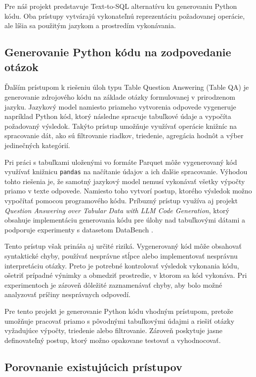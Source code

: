 Pre náš projekt predstavuje Text-to-SQL alternatívu ku generovaniu Python kódu. Oba prístupy vytvárajú vykonateľnú reprezentáciu požadovanej operácie, ale líšia sa použitým jazykom a prostredím vykonávania.

\subsection{Generovanie Python kódu na zodpovedanie otázok}
\label{subsec:python-code-generation}

Ďalším prístupom k riešeniu úloh typu Table Question Answering (Table QA) je generovanie zdrojového kódu na základe otázky formulovanej v prirodzenom jazyku. Jazykový model namiesto priameho vytvorenia odpovede vygeneruje napríklad Python kód, ktorý následne spracuje tabuľkové údaje a vypočíta požadovaný výsledok. Takýto prístup umožňuje využívať operácie knižníc na spracovanie dát, ako sú filtrovanie riadkov, triedenie, agregácia hodnôt a výber jedinečných kategórií.

Pri práci s tabuľkami uloženými vo formáte Parquet môže vygenerovaný kód využívať knižnicu \texttt{pandas} na načítanie údajov a ich ďalšie spracovanie. Výhodou tohto riešenia je, že samotný jazykový model nemusí vykonávať všetky výpočty priamo v texte odpovede. Namiesto toho vytvorí postup, ktorého výsledok možno vypočítať pomocou programového kódu. Príbuzný prístup využíva aj projekt \textit{Question Answering over Tabular Data with LLM Code Generation}, ktorý obsahuje implementáciu generovania kódu pre úlohy nad tabuľkovými dátami a podporuje experimenty s datasetom DataBench \cite{tabularqa}.

Tento prístup však prináša aj určité riziká. Vygenerovaný kód môže obsahovať syntaktické chyby, používať nesprávne stĺpce alebo implementovať nesprávnu interpretáciu otázky. Preto je potrebné kontrolovať výsledok vykonania kódu, ošetriť prípadné výnimky a obmedziť prostredie, v ktorom sa kód vykonáva. Pri experimentoch je zároveň dôležité zaznamenávať chyby, aby bolo možné analyzovať príčiny nesprávnych odpovedí.

Pre tento projekt je generovanie Python kódu vhodným prístupom, pretože umožňuje pracovať priamo s pôvodnými tabuľkovými údajmi a riešiť otázky vyžadujúce výpočty, triedenie alebo filtrovanie. Zároveň poskytuje jasne definovateľný postup, ktorý možno opakovane testovať a vyhodnocovať.

\subsection{Porovnanie existujúcich prístupov}
\label{subsec:comparison-approaches}

